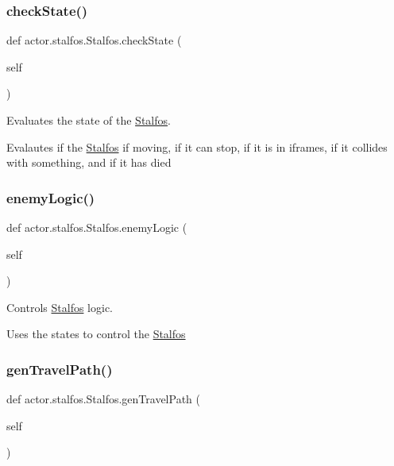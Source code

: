 \subsubsection{\texorpdfstring{check\+State()}{checkState()}}
{\footnotesize\ttfamily def actor.\+stalfos.\+Stalfos.\+check\+State (\begin{DoxyParamCaption}\item[{}]{self }\end{DoxyParamCaption})}



Evaluates the state of the \hyperlink{classactor_1_1stalfos_1_1_stalfos}{Stalfos}. 

Evalautes if the \hyperlink{classactor_1_1stalfos_1_1_stalfos}{Stalfos} if moving, if it can stop, if it is in iframes, if it collides with something, and if it has died \mbox{\label{classactor_1_1stalfos_1_1_stalfos_a1789c1afbf23d5983dec9432578fd058}} 
\subsubsection{\texorpdfstring{enemy\+Logic()}{enemyLogic()}}
{\footnotesize\ttfamily def actor.\+stalfos.\+Stalfos.\+enemy\+Logic (\begin{DoxyParamCaption}\item[{}]{self }\end{DoxyParamCaption})}



Controls \hyperlink{classactor_1_1stalfos_1_1_stalfos}{Stalfos} logic. 

Uses the states to control the \hyperlink{classactor_1_1stalfos_1_1_stalfos}{Stalfos} \mbox{\label{classactor_1_1stalfos_1_1_stalfos_aba32f6c73afde82b410eee05e86c6545}} 
\subsubsection{\texorpdfstring{gen\+Travel\+Path()}{genTravelPath()}}
{\footnotesize\ttfamily def actor.\+stalfos.\+Stalfos.\+gen\+Travel\+Path (\begin{DoxyParamCaption}\item[{}]{self }\end{DoxyParamCaption})}



